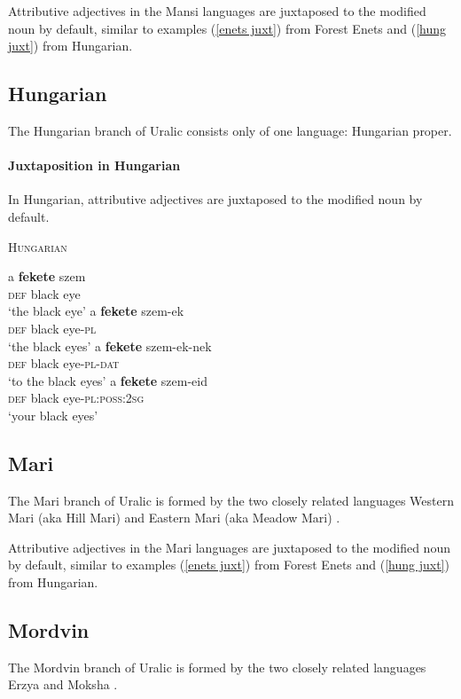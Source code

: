 \noindent Attributive adjectives in the Mansi languages are juxtaposed to the modified noun by default, similar to examples (\ref{enets juxt}) from Forest Enets and (\ref{hung juxt}) from Hungarian.

\subsection{Hungarian}
The Hungarian branch of Uralic consists only of one language: Hungarian proper.%

\paragraph{Juxtaposition in Hungarian}
In Hungarian, attributive adjectives are juxtaposed to the modified noun by default.
\begin{exe}
\ex \textsc{Hungarian} \citep[41]{hall1938} \label{hung juxt}
\begin{xlist}
\ex 
\gll	a \textbf{fekete} szem\\
	\textsc{def} black eye\\
\glt	‘the black eye’
\ex	
\gll	a \textbf{fekete} szem-ek\\
	\textsc{def} black eye-\textsc{pl}\\
\glt	‘the black eyes’
\ex
\gll	a \textbf{fekete} szem-ek-nek\\
	\textsc{def} black eye-\textsc{pl}-\textsc{dat}\\
\glt	‘to the black eyes’
\ex
\gll	a \textbf{fekete} szem-eid\\
	\textsc{def} black eye-\textsc{pl:poss:2sg}\\
\glt	‘your black eyes’
\end{xlist}
\end{exe}

\subsection{Mari}
The Mari branch of Uralic is formed by the two closely related languages Western Mari (aka Hill Mari) and Eastern Mari (aka Meadow Mari) \citep[231]{salminen2007}.

\noindent Attributive adjectives in the Mari languages are juxtaposed to the modified noun by default, similar to examples (\ref{enets juxt}) from Forest Enets and (\ref{hung juxt}) from Hungarian.

\subsection{Mordvin}
The Mordvin branch of Uralic is formed by the two closely related languages Erzya and Moksha \citep[231]{salminen2007}.


